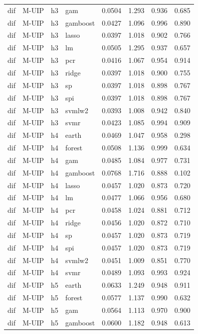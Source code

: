 \begin{ThreePartTable}
\begin{longtable}[t]{llclcccc}
dif & M-UIP & h3 & gam & 0.0504 & 1.293 & 0.936 & 0.685\\
dif & M-UIP & h3 & gamboost & 0.0427 & 1.096 & 0.996 & 0.890\\
dif & M-UIP & h3 & lasso & 0.0397 & 1.018 & 0.902 & 0.766\\
dif & M-UIP & h3 & lm & 0.0505 & 1.295 & 0.937 & 0.657\\
dif & M-UIP & h3 & pcr & 0.0416 & 1.067 & 0.954 & 0.914\\
dif & M-UIP & h3 & ridge & 0.0397 & 1.018 & 0.900 & 0.755\\
dif & M-UIP & h3 & sp & 0.0397 & 1.018 & 0.898 & 0.767\\
dif & M-UIP & h3 & spi & 0.0397 & 1.018 & 0.898 & 0.767\\
dif & M-UIP & h3 & svmlw2 & 0.0393 & 1.008 & 0.942 & 0.840\\
dif & M-UIP & h3 & svmr & 0.0423 & 1.085 & 0.994 & 0.909\\
\addlinespace
dif & M-UIP & h4 & earth & 0.0469 & 1.047 & 0.958 & 0.298\\
dif & M-UIP & h4 & forest & 0.0508 & 1.136 & 0.999 & 0.634\\
dif & M-UIP & h4 & gam & 0.0485 & 1.084 & 0.977 & 0.731\\
dif & M-UIP & h4 & gamboost & 0.0768 & 1.716 & 0.888 & 0.102\\
dif & M-UIP & h4 & lasso & 0.0457 & 1.020 & 0.873 & 0.720\\
dif & M-UIP & h4 & lm & 0.0477 & 1.066 & 0.956 & 0.680\\
dif & M-UIP & h4 & pcr & 0.0458 & 1.024 & 0.881 & 0.712\\
dif & M-UIP & h4 & ridge & 0.0456 & 1.020 & 0.872 & 0.710\\
dif & M-UIP & h4 & sp & 0.0457 & 1.020 & 0.873 & 0.719\\
dif & M-UIP & h4 & spi & 0.0457 & 1.020 & 0.873 & 0.719\\
dif & M-UIP & h4 & svmlw2 & 0.0451 & 1.009 & 0.851 & 0.770\\
dif & M-UIP & h4 & svmr & 0.0489 & 1.093 & 0.993 & 0.924\\
\addlinespace
dif & M-UIP & h5 & earth & 0.0633 & 1.249 & 0.948 & 0.911\\
dif & M-UIP & h5 & forest & 0.0577 & 1.137 & 0.990 & 0.632\\
dif & M-UIP & h5 & gam & 0.0564 & 1.113 & 0.970 & 0.900\\
dif & M-UIP & h5 & gamboost & 0.0600 & 1.182 & 0.948 & 0.613\\

\end{longtable}
\end{ThreePartTable}
